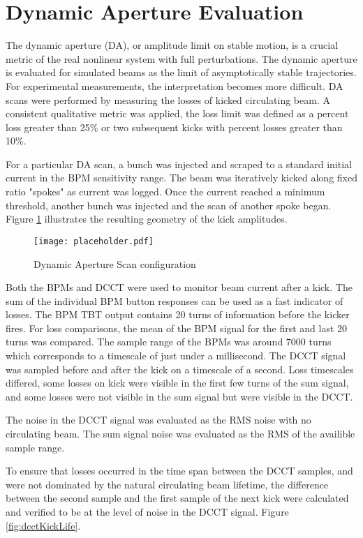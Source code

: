 \section{Dynamic Aperture Evaluation} \label{sec:daEval}
The dynamic aperture (DA), or amplitude limit on stable motion, is a crucial metric of the real nonlinear system with full perturbations. The dynamic aperture is evaluated for simulated beams as the limit of asymptotically stable trajectories. For experimental measurements, the interpretation becomes more difficult. DA scans were performed by measuring the losses of kicked circulating beam. A consistent qualitative metric was applied, the loss limit was defined as a percent loss greater than 25\% or two subsequent kicks with percent losses greater than 10\%.

For a particular DA scan, a bunch was injected and scraped to a standard initial current in the BPM sensitivity range. The beam was iteratively kicked along fixed ratio "spokes" as current was logged. Once the current reached a minimum threshold, another bunch was injected and the scan of another spoke began.  Figure \ref{fig:spokes} illustrates the resulting geometry of the kick amplitudes.

\begin{figure}
	\centering
	\texttt{[image: placeholder.pdf]}
	\caption{Dynamic Aperture Scan configuration}
	\label{fig:spokes}
\end{figure}

Both the BPMs and DCCT were used to monitor beam current after a kick. The sum of the individual BPM button responses can be used as a fast indicator of losses. The BPM TBT output contains 20 turns of information before the kicker fires. For loss comparisons, the mean of the BPM signal for the first and last 20 turns was compared. The sample range of the BPMs was around 7000 turns which corresponds to a timescale of just under a millisecond. The DCCT signal was sampled before and after the kick on a timescale of a second. Loss timescales differed, some losses on kick were visible in the first few turns of the sum signal, and some losses were not visible in the sum signal but were visible in the DCCT. 

The noise in the DCCT signal was evaluated as the RMS noise with no circulating beam. The sum signal noise was evaluated as the RMS of the availible sample range.

To ensure that losses occurred in the time span between the DCCT samples, and were not dominated by the natural circulating beam lifetime, the difference between the second sample and the first sample of the next kick were calculated and verified to be at the level of noise in the DCCT signal. Figure \ref{fig:dcctKickLife}.



